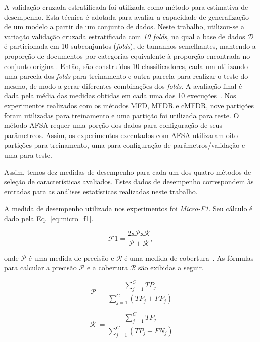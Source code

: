 \documentclass[conference]{IEEEtran}
\begin{document}
A validação cruzada estratificada foi utilizada como método para estimativa de desempenho.
Esta técnica é adotada para avaliar a capacidade de generalização de um modelo a partir de um conjunto de dados.
Neste trabalho, utilizou-se a variação validação cruzada estratificada com \emph{10 folds}, na qual a base de dados $\mathcal{D}$ é particionada em 10 subconjuntos (\emph{folds}), de tamanhos semelhantes, mantendo a proporção de documentos por categorias equivalente à proporção encontrada no conjunto original. Então, são construídos 10 classificadores, cada um utilizando uma parcela dos \emph{folds} para treinamento e outra parcela para realizar o teste do mesmo, de modo a gerar diferentes combinações dos \emph{folds}.
A avaliação final é dada pela média das medidas obtidas em cada uma das 10 execuções~\cite{kohavi1995study}.
Nos experimentos realizados com os métodos MFD, MFDR e cMFDR, nove partições foram utilizadas para treinamento e uma partição foi utilizada para teste.
O método AFSA requer uma porção dos dados para configuração de seus parâmetreos. Assim, os experimentos executados com AFSA utilizaram oito partições para treinamento, uma para configuração de parâmetros/validação e uma para teste.

Assim, temos dez medidas de desempenho para cada um dos quatro métodos de seleção de características avaliados.
Estes dados de desempenho correspondem às entradas para as análises estatísticas realizadas neste trabalho.

A medida de desempenho utilizada nos experimentos foi \textit{Micro-F1}.
Seu cálculo é dado pela Eq.~\ref{eq:micro_f1}.

\begin{equation}
\operatorname{\mathcal{F}{1} = \frac{2 x \mathcal{P} x \mathcal{R}}{\mathcal{P} + \mathcal{R}}},
\label{eq:micro_f1}
\end{equation}

\noindent onde $\mathcal{P}$ é uma medida de precisão e $\mathcal{R}$ é uma medida de cobertura~\cite{chang2008multilabel}. As fórmulas para calcular a precisão $\mathcal{P}$ e a cobertura $\mathcal{R}$ são exibidas a seguir.

\begin{equation}
\operatorname{\mathcal{P}} = \frac{\sum_{j=1}^{C}TP_j}{\sum_{j=1}^{C}(TP_j + FP_j)}
\label{eq:precision}
\end{equation}

\begin{equation}
\operatorname{\mathcal{R}} = \frac{\sum_{j=1}^{C}TP_j}{\sum_{j=1}^{C}(TP_j + FN_j)}
\label{eq:recall}
\end{equation}
\end{document}
